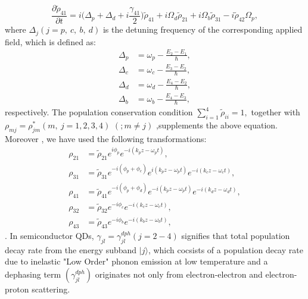 \documentclass[12pt,a4paper]{article}
\begin{document}
\begin{equation}
    \frac{\partial\tilde{\rho}_{41}}{\partial t}=i\big(\Delta_p+\Delta_d+i\frac{\gamma_{41}}{2}\big)\tilde{\rho}_{41}+i\Omega_d\tilde{\rho}_{21}+i\Omega_b\tilde{\rho}_{31}-i\tilde{\rho}_{42}\Omega_p,
\end{equation}
where $\Delta_j{(j=p,\ c,\ b,\ d)}$ is the detuning frequency of the corresponding applied field, which is defined as:
\begin{align}
\Delta_p &= \omega_{p}-\frac{E_2-E_1}{\hbar},\\
\Delta_c &= \omega_{c}-\frac{E_3-E_2}{\hbar},\\
\Delta_d &= \omega_{d}-\frac{E_4-E_2}{\hbar},\\
\Delta_b &= \omega_{b}-\frac{E_4-E_3}{\hbar},
\end{align}
respectively. The population conservation condition \(\sum_{i=1}^{4} \tilde\rho_{ii} = 1,\) together with $\rho_{mj} = \rho_{jm}^*{(m,\ j=1,2,3,4)}$ ${(;m\neq j)}$ ,supplements the above equation. Moreover , we have used the following transformations:
\begin{align}
    \rho_{21} &= \tilde\rho_{21}e^{i\phi_p}e^{-i(k_pz-\omega_pt)},\\
    \rho_{31} &= \tilde\rho_{31}e^{-i(\phi_p+\phi_c)}e^{i(k_pz-\omega_pt)}e^{-i(k_cz-\omega_ct)},\\
    \rho_{41} &= \tilde\rho_{41}e^{-i(\phi_p+\phi_d)}e^{-i(k_pz-\omega_pt)}e^{-i(k_dz-\omega_dt)},\\
    \rho_{32} &= \tilde\rho_{32}e^{-i\phi_c}e^{-i(k_cz-\omega_ct)},\\
    \rho_{43} &= \tilde\rho_{43}e^{-i\phi_b}e^{-i(k_bz-\omega_bt)},
\end{align}.
In semiconductor QDs, $\gamma_{jl} = \gamma^{dph}_{jl}{(j=2-4)}$ signifies that total population decay rate from the energy subband $|j\rangle$, which cocsists of a population decay rate  due to inelastic "Low Order" phonon emission at low temperature and a dephasing term $\left(\gamma^{dph}_{jl}\right)$ originates not only from electron-electron and electron-proton scattering.\par
\end{document}
